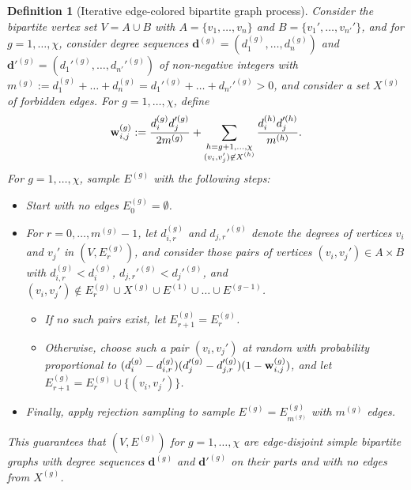 \documentclass{article}
\theoremstyle{plain}
\theoremstyle{remark}
\theoremstyle{plain}
\newtheorem{definition}[theorem]{Definition}
\numberwithin{equation}{section}
\renewcommand{\d}{{\boldsymbol{d}}}
\renewcommand{\b}{{\bf{w}}}
\begin{document}
	\begin{definition}[Iterative edge-colored bipartite graph process]
		Consider the bipartite vertex set $V=A\cup B$ with $A=\{v_1,\ldots,v_n\}$ and $B=\{v_1',\ldots,v_{n'}'\}$, and for $g=1,\ldots,\chi$, consider degree sequences $\d^{(g)}=(d_1^{(g)},\ldots,d_n^{(g)})$ and $\d'^{(g)}=(d_1'^{(g)},\ldots,d_{n'}'^{(g)})$ of non-negative integers with $m^{(g)}:=d_1^{(g)}+\ldots+d_n^{(g)}=d_1'^{(g)}+\ldots+d_{n'}'^{(g)}>0$, and consider a set $X^{(g)}$ of forbidden edges. For $g=1,\ldots,\chi$, define $$\b^{(g)}_{i,j}:=\frac{d_i^{(g)}d_j'^{(g)}}{2m^{(g)}}+\sum_{\substack{h=g+1,\ldots,\chi\\(v_i,v_j')\not\in X^{(h)}}}\frac{d_i^{(h)}d_j'^{(h)}}{m^{(h)}}.$$ For $g=1,\ldots,\chi$, sample $E^{(g)}$ with the following steps:
		\begin{itemize}
			\item Start with no edges $E_0^{(g)}=\emptyset$.
			\item For $r=0,\ldots,m^{(g)}-1$, let $d_{i,r}^{(g)}$ and $d_{j,r}'^{(g)}$ denote the degrees of vertices $v_i$ and $v_j'$ in $(V,E_r^{(g)})$, and consider those pairs of vertices $(v_i,v_j')\in A\times B$ with $d_{i,r}^{(g)}<d_i^{(g)}$, $d_{j,r}'^{(g)}<d_j'^{(g)}$, and $(v_i,v_j')\not\in E_r^{(g)}\cup X^{(g)}\cup E^{(1)}\cup\ldots\cup E^{(g-1)}$.
			\begin{itemize}
				\item If no such pairs exist, let $E_{r+1}^{(g)}=E_r^{(g)}$.
				\item Otherwise, choose such a pair $(v_i,v_j')$ at random with probability proportional to $(d_i^{(g)}-d_{i,r}^{(g)})(d_j'^{(g)}-d_{j,r}'^{(g)})(1-\b^{(g)}_{i,j})$, and let $E_{r+1}^{(g)}=E_r^{(g)}\cup\{(v_i,v_j')\}$.
			\end{itemize}
			\item Finally, apply rejection sampling to sample $E^{(g)}=E_{m^{(g)}}^{(g)}$ with $m^{(g)}$ edges.
		\end{itemize}
		This guarantees that $(V,E^{(g)})$ for $g=1,\ldots,\chi$ are edge-disjoint simple bipartite graphs with degree sequences $\d^{(g)}$ and $\d'^{(g)}$ on their parts and with no edges from $X^{(g)}$.
	\end{definition}
	
\end{document}
